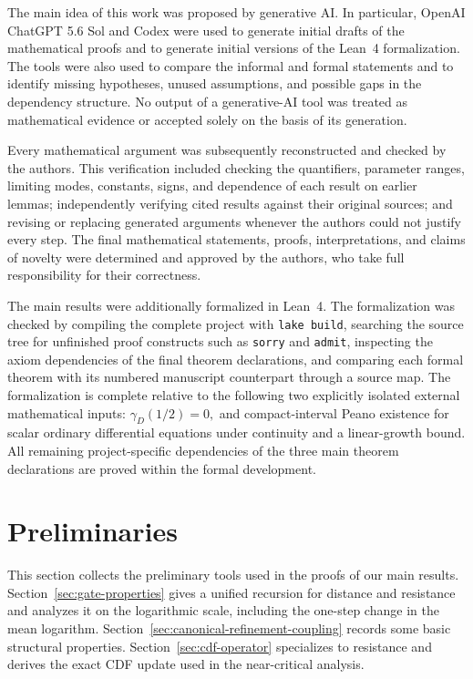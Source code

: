 \documentclass[12pt]{amsart}
\numberwithin{equation}{section}
\theoremstyle{plain}
\theoremstyle{definition}
\begin{document}
The main idea of this work was proposed by generative AI.
In particular, OpenAI ChatGPT 5.6 Sol and Codex
were used to generate initial drafts of the mathematical proofs and to generate
initial versions of the Lean~4 formalization.  The tools were also used
to compare the informal and formal statements and to identify missing
hypotheses, unused assumptions, and possible gaps in the dependency
structure.  No output of a generative-AI tool was treated as mathematical
evidence or accepted solely on the basis of its generation.

Every mathematical argument was subsequently reconstructed and checked
by the authors.  This verification included checking the quantifiers,
parameter ranges, limiting modes, constants, signs, and dependence of
each result on earlier lemmas; independently verifying cited results
against their original sources; and revising or replacing generated
arguments whenever the authors could not justify every step.  The final
mathematical statements, proofs, interpretations, and claims of novelty
were determined and approved by the authors, who take full responsibility
for their correctness.

The main results were additionally formalized in Lean~4.  The
formalization was checked by compiling the complete project with
\texttt{lake build}, searching the source tree for unfinished proof
constructs such as \texttt{sorry} and \texttt{admit}, inspecting the
axiom dependencies of the final theorem declarations, and comparing
each formal theorem with its numbered manuscript counterpart through a
source map.  The formalization is complete relative to the following
two explicitly isolated external mathematical inputs:
\(    \gamma_D(1/2)=0, \)
and compact-interval Peano existence for scalar ordinary differential
equations under continuity and a linear-growth bound.    All remaining project-specific
dependencies of the three main theorem declarations are proved within
the formal development.
\section{Preliminaries}
\label{sec:preliminaries}

This section collects the preliminary tools used in the proofs of our main
results.  Section~\ref{sec:gate-properties} gives a unified recursion for
distance and resistance and analyzes it on the logarithmic scale, including
the one-step change in the mean logarithm.
Section~\ref{sec:canonical-refinement-coupling} records some basic structural
properties.
Section~\ref{sec:cdf-operator} specializes to resistance and derives the exact
CDF update used in the near-critical analysis.
\end{document}
